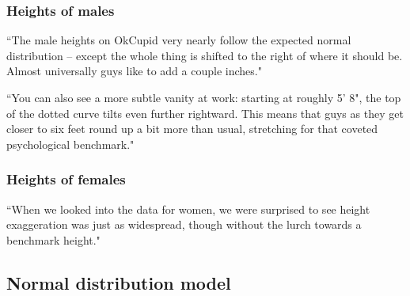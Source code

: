 \documentclass[slidestop,compress,mathserif]{beamer}
\makeatletter
\def\chp4@path{../../Chp 4}
\makeatother
\begin{document}
\begin{frame}
\frametitle{Heights of males}

{
\pause
{\footnotesize``The male heights on OkCupid very nearly follow the expected normal distribution -- except the whole thing is shifted to the right of where it should be. Almost universally guys like to add a couple inches." 

``You can also see a more subtle vanity at work: starting at roughly 5' 8", the top of the dotted curve tilts even further rightward. This means that guys as they get closer to six feet round up a bit more than usual, stretching for that coveted psychological benchmark."
}
}


\end{frame}


\begin{frame}
\frametitle{Heights of females}

{
\pause
{\footnotesize ``When we looked into the data for women, we were surprised to see height exaggeration was just as widespread, though without the lurch towards a benchmark height."
}
}

\vfill


\end{frame}


\subsection{Normal distribution model}



\end{document}
